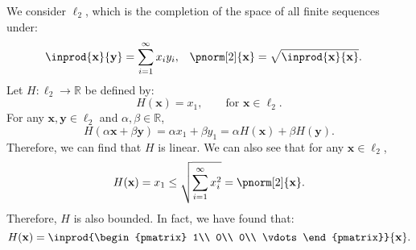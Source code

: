 \documentclass{huhtakm-template-book-v2}
\begin{document}
    \begin{eg}
        We consider $\ell_{2}$, which is the completion of the space of all finite sequences under:
        \begin{align*}
            \inprod{\mathbf{x}}{\mathbf{y}}&=\sum_{i=1}^{\infty}x_{i}y_{i}, & \pnorm[2]{\mathbf{x}}&=\sqrt{\inprod{\mathbf{x}}{\mathbf{x}}}.
        \end{align*}
        Let $H:\ell_{2}\to\mathbb{R}$ be defined by:
        \begin{equation*}
            H(\mathbf{x})=x_{1}, \qquad \text{for } \mathbf{x}\in\ell_{2}.
        \end{equation*}
        For any $\mathbf{x},\mathbf{y}\in\ell_{2}$ and $\alpha,\beta\in\mathbb{R}$,
        \begin{equation*}
            H(\alpha\mathbf{x}+\beta\mathbf{y})=\alpha x_{1}+\beta y_{1}=\alpha H(\mathbf{x})+\beta H(\mathbf{y}).
        \end{equation*}
        Therefore, we can find that $H$ is linear. We can also see that for any $\mathbf{x}\in\ell_{2}$,
        \begin{equation*}
            H(\mathbf{x})=x_{1}\leq\sqrt{\sum_{i=1}^{\infty}x_{i}^{2}}=\pnorm[2]{\mathbf{x}}.
        \end{equation*}
        Therefore, $H$ is also bounded. In fact, we have found that:
        \begin{equation*}
            H(\mathbf{x})=\inprod{\begin{pmatrix}
                    1\\
                    0\\
                    0\\
                    \vdots
                \end{pmatrix}}{\mathbf{x}}.
        \end{equation*}
    \end{eg}
    \newpage
\end{document}
